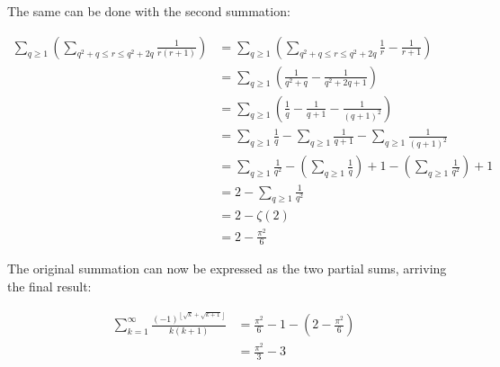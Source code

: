 \documentclass{letter}
\begin{document}
\begin{letter}{}
The same can be done with the second summation:

\begin{align*}
\sum_{q\ge 1}\left(\sum_{q^2+q\le r\le q^2+2q}\frac{1}{r(r+1)}\right)
  &= 
  \sum_{q\ge 1}\left(\sum_{q^2+q\le r\le q^2+2q}\frac{1}{r}-\frac{1}{r+1}\right) \\
  &=
  \sum_{q\ge 1}\left(\frac{1}{q^2+q}-\frac{1}{q^2+2q+1}\right) \\
  &=
  \sum_{q\ge 1}\left(\frac{1}{q}-\frac{1}{q+1}-\frac{1}{(q+1)^2}\right) \\
  &=
  \sum_{q\ge 1}\frac{1}{q}
  -\sum_{q\ge 1}\frac{1}{q+1}
  -\sum_{q\ge 1}\frac{1}{(q+1)^2} \\
  &=
  \sum_{q\ge 1}\frac{1}{q^2}
  -\left(\sum_{q\ge 1}\frac{1}{q}\right)+1
  -\left(\sum_{q\ge 1}\frac{1}{q^2}\right)+1 \\
  &=
  2-\sum_{q\ge 1}\frac{1}{q^2} \\
  &=2-\zeta(2) \\
  &=2-\frac{\pi^2}{6}
\end{align*}

The original summation can now be expressed as the two partial sums, arriving the final result:
  
  \begin{align*}
    \sum_{k=1}^{\infty}\frac{(-1)^{\left\lfloor\sqrt{k}+\sqrt{k+1}\right\rfloor}}{k(k+1)}
    &= \frac{\pi^2}{6}-1-\left(2-\frac{\pi^2}{6}\right) \\
    &= \frac{\pi^2}{3}-3
  \end{align*}

\end{letter}
\end{document}
